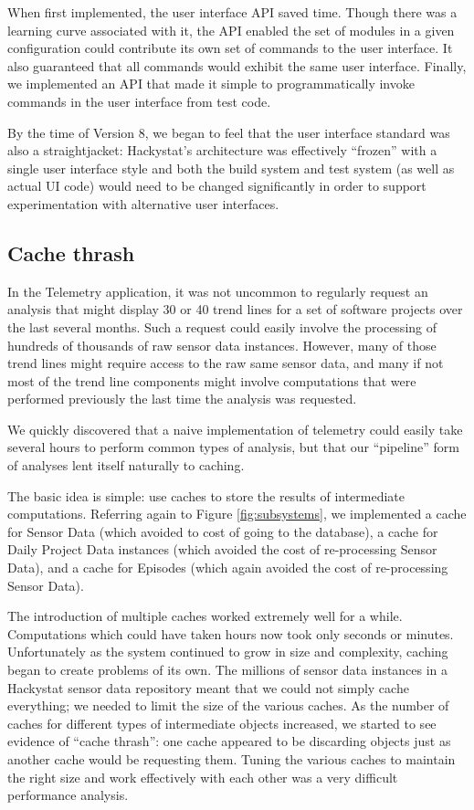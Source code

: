 \documentclass[conference,compsoc,peerreview]{IEEEtran}
\begin{document}
When first implemented, the user interface API saved time.  Though there
was a learning curve associated with it, the API enabled the set of modules
in a given configuration could contribute its own set of commands to the
user interface.  It also guaranteed that all commands would exhibit the
same user interface. Finally, we implemented an API that made it simple to
programmatically invoke commands in the user interface from test code.

By the time of Version 8, we began to feel that the user interface standard
was also a straightjacket: Hackystat's architecture was effectively
``frozen'' with a single user interface style and both the build system and
test system (as well as actual UI code) would need to be changed
significantly in order to support experimentation with alternative user
interfaces.

\subsection{Cache thrash}
\label{sec:caching}

In the Telemetry application, it was not uncommon to regularly request an
analysis that might display 30 or 40 trend lines for a set of software
projects over the last several months. Such a request could easily involve
the processing of hundreds of thousands of raw sensor data
instances. However, many of those trend lines might require access to the
raw same sensor data, and many if not most of the trend line components
might involve computations that were performed previously the last time the
analysis was requested.

We quickly discovered that a naive implementation of telemetry could
easily take several hours to perform common types of analysis, but that our 
``pipeline'' form of analyses lent itself naturally to caching.

The basic idea is simple: use caches to store the results of intermediate
computations.  Referring again to Figure \ref{fig:subsystems}, we
implemented a cache for Sensor Data (which avoided to cost of going to the
database), a cache for Daily Project Data instances (which avoided the cost
of re-processing Sensor Data), and a cache for Episodes (which again
avoided the cost of re-processing Sensor Data).

The introduction of multiple caches worked extremely well for a while.
Computations which could have taken hours now took only seconds or minutes.
Unfortunately as the system continued to grow in size and complexity,
caching began to create problems of its own.  The millions of sensor data
instances in a Hackystat sensor data repository meant that we could not
simply cache everything; we needed to limit the size of the various caches.
As the number of caches for different types of intermediate objects
increased, we started to see evidence of ``cache thrash'': one cache
appeared to be discarding objects just as another cache would be requesting
them. Tuning the various caches to maintain the right size and work
effectively with each other was a very difficult performance analysis.
\end{document}
